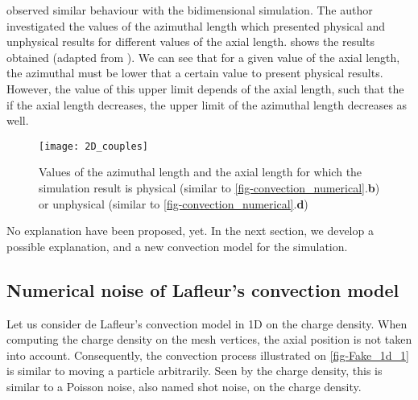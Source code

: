     \FloatBarrier
    \citet{croes2017} observed similar behaviour with the bidimensional  simulation.
    The author investigated the values of the azimuthal length which presented physical and unphysical results
    for different values of the axial length.
     shows the results obtained (adapted from \citep{croes2017}).
    We can see that for a given value of the axial length, the azimuthal must be lower that a certain value to present physical results.
    However, the value of this upper limit depends of the axial length, such that the if the axial length decreases, the upper limit of the azimuthal length decreases as well.

    \begin{figure}[hbtp]
      \centering
      \texttt{[image: 2D\_couples]}
      \caption{Values of the azimuthal length and the axial length for which the simulation result is physical (similar to \cref{fig-convection_numerical}.{\bf b}) or unphysical  (similar to \cref{fig-convection_numerical}.{\bf d}) }
      \label{fig-couplesCroes}
    \end{figure}

    No explanation have been proposed, yet.
    In the next section, we develop a possible explanation, and a new convection model for the simulation.

  \subsection{Numerical noise of Lafleur's convection model}

    Let us consider de Lafleur's convection model in \ac{1D} on the charge density.
    When computing the charge density on the mesh vertices, the axial position is not taken into account.
    Consequently, the convection process illustrated on \cref{fig-Fake_1d_1} is similar to moving a particle arbitrarily.
    Seen by the charge density, this is similar to a Poisson noise, also named shot noise, on the charge density.

